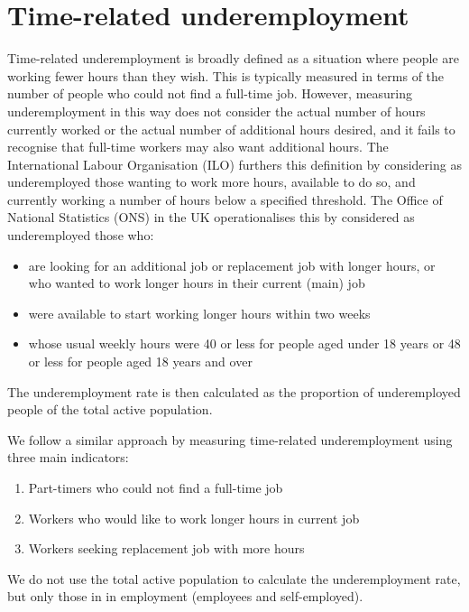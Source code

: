\documentclass[
]{book}
\providecommand{\tightlist}{%
  \setlength{\itemsep}{0pt}\setlength{\parskip}{0pt}}
\begin{document}
\hypertarget{time-related-underemployment}{%
\chapter{Time-related underemployment}\label{time-related-underemployment}}

Time-related underemployment is broadly defined as a situation where people are working fewer hours than they wish. This is typically measured in terms of the number of people who could not find a full-time job. However, measuring underemployment in this way does not consider the actual number of hours currently worked or the actual number of additional hours desired, and it fails to recognise that full-time workers may also want additional hours. The International Labour Organisation (ILO) furthers this definition by considering as underemployed those wanting to work more hours, available to do so, and currently working a number of hours below a specified threshold. The Office of National Statistics (ONS) in the UK operationalises this by considered as underemployed those who:

\begin{itemize}
\tightlist
\item
  are looking for an additional job or replacement job with longer hours, or who wanted to work longer hours in their current (main) job
\item
  were available to start working longer hours within two weeks
\item
  whose usual weekly hours were 40 or less for people aged under 18 years or 48 or less for people aged 18 years and over
\end{itemize}

The underemployment rate is then calculated as the proportion of underemployed people of the total active population.

We follow a similar approach by measuring time-related underemployment using three main indicators:

\begin{enumerate}
\def\labelenumi{\arabic{enumi}.}
\tightlist
\item
  Part-timers who could not find a full-time job
\item
  Workers who would like to work longer hours in current job
\item
  Workers seeking replacement job with more hours
\end{enumerate}

We do not use the total active population to calculate the underemployment rate, but only those in in employment (employees and self-employed).
\end{document}
